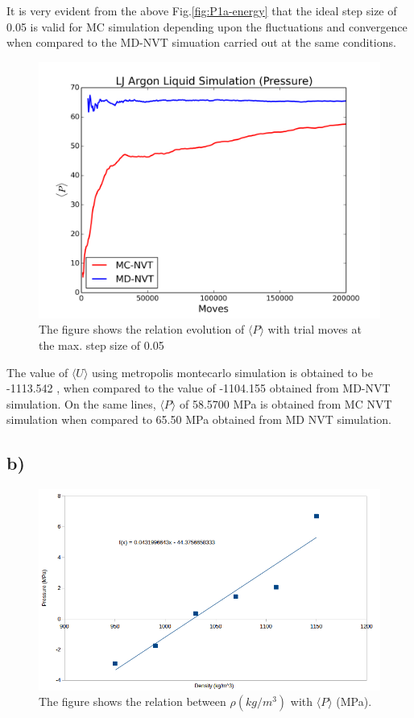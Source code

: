 \documentclass{article}
\begin{document}
It is very evident from the above Fig.\ref{fig:P1a-energy} that the ideal step size of 0.05 is valid for MC simulation depending upon the fluctuations and convergence when compared to the MD-NVT simuation carried out at the same conditions.

\begin{figure}[htb]
\centering
\includegraphics[width=.9\linewidth]{./P1/LJ-md-Pressure.png}
\caption{\label{fig:P1b-pressure}The figure shows the relation evolution of $\langle P \rangle$ with trial moves at the max. step size of 0.05}
\end{figure}

The value of $\langle U \rangle$ using metropolis montecarlo simulation is obtained to be -1113.542 , when compared to the value of -1104.155 obtained from MD-NVT simulation. On the same lines, $\langle P \rangle$ of 58.5700 MPa is obtained from MC NVT simulation when compared to 65.50 MPa obtained from MD NVT simulation.

\subsection{b)}
\label{sec-1-3}
\begin{figure}[htb]
\centering
\includegraphics[width=.9\linewidth]{./P1/zero-pressure-density.png}
\caption{\label{fig:P1b}The figure shows the relation between $\rho(kg/m^3)$ with $\langle P \rangle$ (MPa).}
\end{figure}
\end{document}

